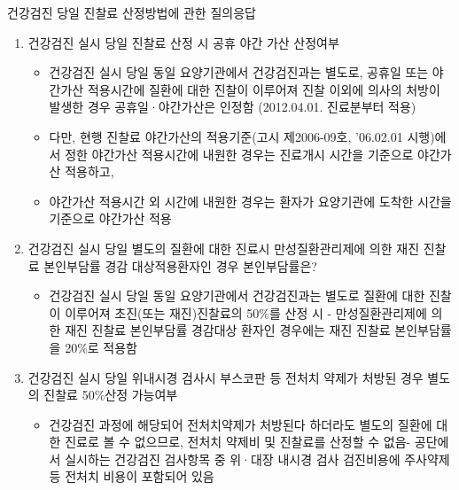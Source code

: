 \begin{commentbox}{건강검진 당일 진찰료 산정방법에 관한 질의응답}
\begin{enumerate}[1.]\tightlist
\item 건강검진 실시 당일 진찰료 산정 시 공휴 야간 가산 산정여부
	\begin{itemize}\tightlist
	\item 건강검진 실시 당일 동일 요양기관에서 건강검진과는 별도로, 공휴일 또는 야간가산 적용시간에 질환에 대한 진찰이 이루어져 진찰 이외에 의사의 처방이 발생한 경우 공휴일·야간가산은 인정함 (2012.04.01. 진료분부터 적용)
	\item 다만, 현행 진찰료 야간가산의 적용기준(고시 제2006-09호, ’06.02.01 시행)에서 정한 야간가산 적용시간에 내원한 경우는 진료개시 시간을 기준으로 야간가산 적용하고,
	\item 야간가산 적용시간 외 시간에 내원한 경우는 환자가 요양기관에 도착한 시간을 기준으로 야간가산 적용
	\end{itemize}
\item 건강검진 실시 당일 별도의 질환에 대한 진료시 만성질환관리제에 의한 재진 진찰료 본인부담률 경감 대상적용환자인 경우 본인부담률은?
	\begin{itemize}\tightlist
	\item 건강검진 실시 당일 동일 요양기관에서 건강검진과는 별도로 질환에 대한 진찰이 이루어져 초진(또는 재진)진찰료의 50\%를 산정 시\newline
- 만성질환관리제에 의한 재진 진찰료 본인부담률 경감대상 환자인 경우에는 재진 진찰료 본인부담률을 20\%로 적용함
	\end{itemize}
\item 건강검진 실시 당일 위내시경 검사시 부스코판 등 전처치 약제가 처방된 경우 별도의 진찰료 50\%산정 가능여부
	\begin{itemize}\tightlist
	\item 건강검진 과정에 해당되어 전처치약제가 처방된다 하더라도 별도의 질환에 대한 진료로 볼 수 없으므로, 전처치 약제비 및 진찰료를 산정할 수 없음\newline - 공단에서 실시하는 건강검진 검사항목 중 위·대장 내시경 검사 검진비용에 주사약제 등 전처치 비용이 포함되어 있음
	\end{itemize}
\end{enumerate}
\end{commentbox}


